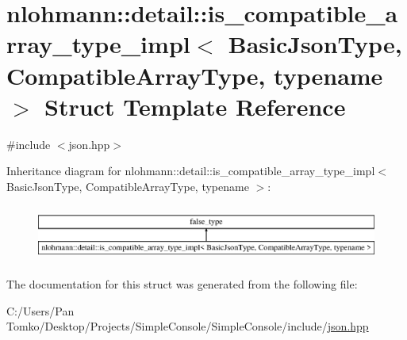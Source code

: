 \hypertarget{structnlohmann_1_1detail_1_1is__compatible__array__type__impl}{}\section{nlohmann\+::detail\+::is\+\_\+compatible\+\_\+array\+\_\+type\+\_\+impl$<$ Basic\+Json\+Type, Compatible\+Array\+Type, typename $>$ Struct Template Reference}
\label{structnlohmann_1_1detail_1_1is__compatible__array__type__impl}


{\ttfamily \#include $<$json.\+hpp$>$}

Inheritance diagram for nlohmann\+::detail\+::is\+\_\+compatible\+\_\+array\+\_\+type\+\_\+impl$<$ Basic\+Json\+Type, Compatible\+Array\+Type, typename $>$\+:\begin{figure}[H]
\begin{center}
\leavevmode
\includegraphics[height=1.882353cm]{dc/d4b/structnlohmann_1_1detail_1_1is__compatible__array__type__impl}
\end{center}
\end{figure}


The documentation for this struct was generated from the following file\+:\begin{DoxyCompactItemize}
\item 
C\+:/\+Users/\+Pan Tomko/\+Desktop/\+Projects/\+Simple\+Console/\+Simple\+Console/include/\mbox{\hyperlink{json_8hpp}{json.\+hpp}}\end{DoxyCompactItemize}
